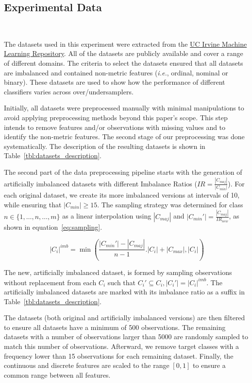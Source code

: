 \documentclass[preprint,12pt]{elsarticle}
\begin{document}
{\subsection{Experimental Data}~\label{sec:experimental_data}

The datasets used in this experiment were extracted from the
\href{https://archive.ics.uci.edu}{UC Irvine Machine Learning Repository}. All
of the datasets are publicly available and cover a range of different domains.
The criteria to select the datasets ensured that all datasets are imbalanced
and contained non-metric features (\textit{i.e.}, ordinal, nominal or binary).
These datasets are used to show how the performance of different
classifiers varies across over/undersamplers.

Initially, all datasets were preprocessed manually with minimal manipulations
to avoid applying preprocessing methods beyond this paper's scope. This step
intends to remove features and/or observations with missing values and to
identify the non-metric features. The second stage of our preprocessing was
done systematically. The description of the resulting datasets is shown in
Table~\ref{tbl:datasets_description}.



The second part of the data preprocessing pipeline starts with the generation
of artificially imbalanced datasets with different Imbalance Ratios
($IR=\frac{|C_{maj}|}{|C_{min}|}$). For each original dataset, we create its
more imbalanced versions at intervals of 10, while ensuring that $|C_{min}|
\ge 15$. The sampling strategy was determined for class $n \in
\{1,\ldots,n,\ldots,m\}$ as a linear interpolation using $|C_{maj}|$ and
$|C_{min}'|=\frac{|C_{maj}|}{IR_{new}}$, as shown in
equation~\ref{eq:sampling}.

\begin{equation}~\label{eq:sampling}
    |C_i|^{imb} =
    \min(\frac{|C_{min}'|-|C_{maj}|}{n-1}.|C_i|+|C_{max}|, |C_i|)
\end{equation}

The new, artificially imbalanced dataset, is formed by sampling observations
without replacement from each $C_i$ such that $C_i' \subseteq C_i , |C_i'| =
|C_i|^{imb}$. The artificially imbalanced datasets are marked with its
imbalance ratio as a suffix in Table~\ref{tbl:datasets_description}.

The datasets (both original and artificially imbalanced versions) are then
filtered to ensure all datasets have a minimum of 500 observations.  The
remaining datasets with a number of observations larger than 5000 are randomly
sampled to match this number of observations. Afterward, we remove target
classes with a frequency lower than 15 observations for each remaining
dataset. Finally, the continuous and discrete features are scaled to the
range $[0,1]$ to ensure a common range between all features. 

}
\end{document}
